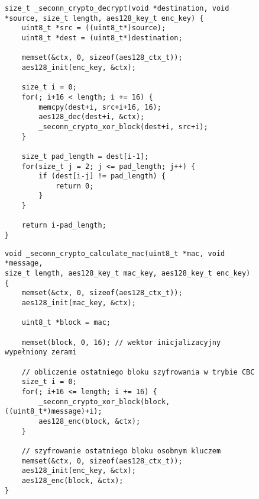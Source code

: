 \begin{figure}
\begin{lstlisting}[caption={Odszyfrowanie CBC wraz z obsługą dopełnienia PKCS\#7},label={lst:decrypt}]
size_t _seconn_crypto_decrypt(void *destination, void *source, size_t length, aes128_key_t enc_key) {
    uint8_t *src = ((uint8_t*)source);
    uint8_t *dest = (uint8_t*)destination;

    memset(&ctx, 0, sizeof(aes128_ctx_t));
    aes128_init(enc_key, &ctx);

    size_t i = 0;
    for(; i+16 < length; i += 16) {
        memcpy(dest+i, src+i+16, 16);
        aes128_dec(dest+i, &ctx);
        _seconn_crypto_xor_block(dest+i, src+i);
    }

    size_t pad_length = dest[i-1];
    for(size_t j = 2; j <= pad_length; j++) {
        if (dest[i-j] != pad_length) {
            return 0;
        }
    }

    return i-pad_length;
}
\end{lstlisting}
\end{figure}

\begin{figure}
\begin{lstlisting}[caption={Obliczanie \gls{mac} dla wiadomości},label={lst:mac}]
void _seconn_crypto_calculate_mac(uint8_t *mac, void *message,
size_t length, aes128_key_t mac_key, aes128_key_t enc_key) {
    memset(&ctx, 0, sizeof(aes128_ctx_t));
    aes128_init(mac_key, &ctx);

    uint8_t *block = mac;

    memset(block, 0, 16); // wektor inicjalizacyjny wypełniony zerami

    // obliczenie ostatniego bloku szyfrowania w trybie CBC
    size_t i = 0;
    for(; i+16 <= length; i += 16) {
        _seconn_crypto_xor_block(block, ((uint8_t*)message)+i);
        aes128_enc(block, &ctx);
    }

    // szyfrowanie ostatniego bloku osobnym kluczem
    memset(&ctx, 0, sizeof(aes128_ctx_t));
    aes128_init(enc_key, &ctx);
    aes128_enc(block, &ctx);
}
\end{lstlisting}
\end{figure}
